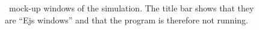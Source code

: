 \begin{figure}[htb]
  \centering
  \caption{\ejs\ mock-up windows of the  simulation. The title bar shows that they are ``Ejs windows''
  and that the program is therefore not running.}
  \label{fig:02EjsIntro/SpringInterface}
\end{figure}

